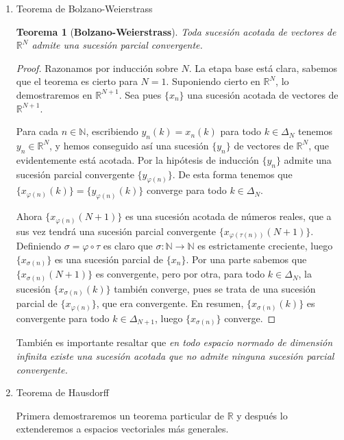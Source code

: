 \documentclass[a4paper, 12pt]{article}
\newtheorem{teorema}{Teorema}
\begin{document}
\begin{enumerate}[label=\textbf{\arabic*}.]
		\begin{enumerate}[label=\textit{\alph*})]
			\item Teorema de Bolzano-Weierstrass
			
			\begin{teorema}[\textbf{Bolzano-Weierstrass}]
			Toda sucesión acotada de vectores de \(\mathbb{R}^N\) admite una sucesión parcial convergente.
			\end{teorema}
			
			\begin{proof}
			Razonamos por inducción sobre \(N\). La etapa base está clara, sabemos que el teorema es cierto para \(N =1\). Suponiendo cierto en \(\mathbb{R}^N\), lo demostraremos en \(\mathbb{R}^{N+1}\). Sea pues \(\{x_n\}\) una sucesión acotada de vectores de \(\mathbb{R}^{N+1}\).
			
			Para cada \(n \in \mathbb{N}\), escribiendo \(y_n(k) = x_n(k)\) para todo \(k \in \Delta_N\) tenemos \(y_n \in \mathbb{R}^N\), y hemos conseguido así una sucesión \(\{y_n\}\) de vectores de \(\mathbb{R}^N\), que evidentemente está acotada. Por la hipótesis de inducción \(\{y_n\}\) admite una sucesión parcial convergente \(\{y_{\varphi(n)}\}\). De esta forma tenemos que \(\{x_{\varphi (n)} (k)\} = \{y_{\varphi (n)} (k)\}\) converge para todo \(k \in \Delta_N\).
			
			Ahora \(\{x_{\varphi (n)} (N+1)\}\) es una sucesión acotada de números reales, que a sus vez tendrá una sucesión parcial convergente \(\{x_{\varphi (\tau (n))} (N+1)\}\). Definiendo \(\sigma = \varphi \circ \tau\) es claro que \(\sigma : \mathbb{N} \rightarrow \mathbb{N}\) es estrictamente creciente, luego \(\{x_{\sigma(n)}\}\) es una sucesión parcial de \(\{x_n\}\). Por una parte sabemos que \(\{x_{\sigma (n)}(N+1)\}\) es convergente, pero por otra, para todo \(k \in \Delta_N\), la sucesión \(\{x_{\sigma (n)}(k)\}\) también converge, pues se trata de una sucesión parcial de \(\{x_{\varphi (n)}\}\), que era convergente. En resumen, \(\{x_{\sigma(n)}(k)\}\) es convergente para todo \(k \in \Delta_{N+1}\), luego \(\{x_{\sigma (n)}\}\) converge. 
			\end{proof}
			
			También es importante resaltar que \textit{en todo espacio normado de dimensión infinita existe una sucesión acotada que no admite ninguna sucesión parcial convergente.}
			
			\item Teorema de Hausdorff
			
			Primera demostraremos un teorema particular de \(\mathbb{R}\) y después lo extenderemos a espacios vectoriales más generales. \\
			

\end{enumerate}
\end{enumerate}
\end{document}
